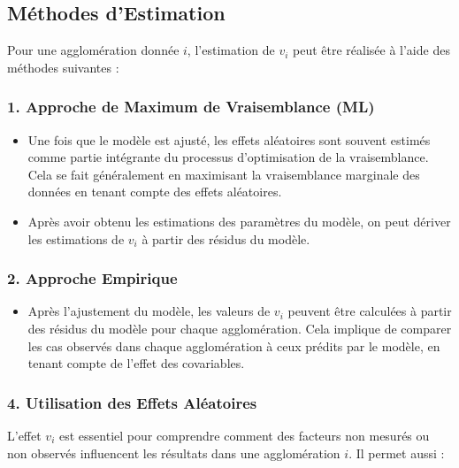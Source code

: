 \documentclass[
]{article}
\providecommand{\tightlist}{%
  \setlength{\itemsep}{0pt}\setlength{\parskip}{0pt}}
\begin{document}
\subsection{Méthodes d'Estimation}\label{muxe9thodes-destimation}

Pour une agglomération donnée \(i\), l'estimation de \(v_i\) peut être
réalisée à l'aide des méthodes suivantes :

\subsubsection{1. Approche de Maximum de Vraisemblance
(ML)}\label{approche-de-maximum-de-vraisemblance-ml}

\begin{itemize}
\item
  Une fois que le modèle est ajusté, les effets aléatoires sont souvent
  estimés comme partie intégrante du processus d'optimisation de la
  vraisemblance. Cela se fait généralement en maximisant la
  vraisemblance marginale des données en tenant compte des effets
  aléatoires.
\item
  Après avoir obtenu les estimations des paramètres du modèle, on peut
  dériver les estimations de \(v_i\) à partir des résidus du modèle.
\end{itemize}

\subsubsection{2. Approche Empirique}\label{approche-empirique}

\begin{itemize}
\tightlist
\item
  Après l'ajustement du modèle, les valeurs de \(v_i\) peuvent être
  calculées à partir des résidus du modèle pour chaque agglomération.
  Cela implique de comparer les cas observés dans chaque agglomération à
  ceux prédits par le modèle, en tenant compte de l'effet des
  covariables.
\end{itemize}

\subsubsection{4. Utilisation des Effets
Aléatoires}\label{utilisation-des-effets-aluxe9atoires}

L'effet \(v_i\) est essentiel pour comprendre comment des facteurs non
mesurés ou non observés influencent les résultats dans une agglomération
\(i\). Il permet aussi :
\end{document}

